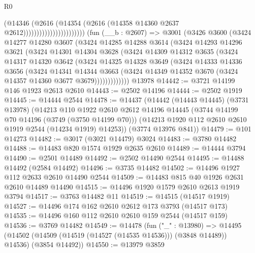 \begin{lexlean}{R0}
\begin{coremodule}
                                        (@14346
                                          (@2616
                                            (@14354
                                              (@2616
                                                (@14358 @14360 @2637 @2612)))))))))))))))))))))))
    (fun (__b : @2607) =>
    @3001
      (@3426
        @3600
        (@3424
          @14277
          @14280
          @3607
          (@3424
            @14285
            @14288
            @3614
            (@3424
              @14293
              @14296
              @3621
              (@3424
                @14301
                @14304
                @3628
                (@3424
                  @14309
                  @14312
                  @3635
                  (@3424
                    @14317
                    @14320
                    @3642
                    (@3424
                      @14325
                      @14328
                      @3649
                      (@3424
                        @14333
                        @14336
                        @3656
                        (@3424
                          @14341
                          @14344
                          @3663
                          (@3424 @14349 @14352 @3670 (@3424 @14357 @14360 @3677 @3679)))))))))))))
    @13978
@14442 := @3721 @14199 @146 @1923 @2613 @2610
@14443 := @2502 @14196
@14444 := @2502 @1919
@14445 := @14444 @2544
@14478 := @14437
    (@14442
      (@14443 @14445)
      (@3731 @13978)
      (@14213
        @110
        @1922
        @2610
        @2612
        @14196
        @14445
        (@3744 @14199 @70 @14196 (@3749 (@3750 @14199 @70)))
        (@14213 @1920 @112 @2610 @2610 @1919 @2544 (@14234 @1919) @14253))
      (@3774 @13976 @841))
@14479 := @101 @14273
@14482 := @3017 (@3021 @14479) @3024
@14483 := @3780 @14482
@14488 := @14483 @820 @1574 @1929 @2635 @2610
@14489 := @14444 @3794
@14490 := @2501 @14489
@14492 := @2502 @14490 @2544
@14495 := @14488 @14492 (@2584 @14492)
@14496 := @3735 @14482
@14502 := @14496 @1927 @112 @2633 @2610 @14490 @2544
@14509 := @14483 @815 @40 @1926 @2631 @2610 @14489 @14490
@14515 := @14496 @1920 @1579 @2610 @2613 @1919 @3794
@14517 := @3763 @14482 @11
@14519 := @14515 (@14517 @1919)
@14527 := @14496 @174 @162 @2610 @2612 @173 @3793 (@14517 @173)
@14535 := @14496 @160 @112 @2610 @2610 @159 @2544 (@14517 @159)
@14536 := @3769 @14482
@14549 := @14478
    (fun ("_" : @13980) =>
    @14495 (@14502 (@14509 (@14519 (@14527 (@14535 @14536))) (@3848 @14489)) @14536) (@3854 @14492))
@14550 := @13979 @3859

\end{coremodule}
\end{lexlean}
